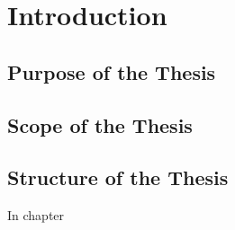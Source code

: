 \chapter{Introduction}
\label{cha:introduction}


\section{Purpose of the Thesis}
\label{sec:purpose}



\section{Scope of the Thesis}
\label{sec:scope}




\section{Structure of the Thesis}
\label{sec:structure}

In chapter 

















